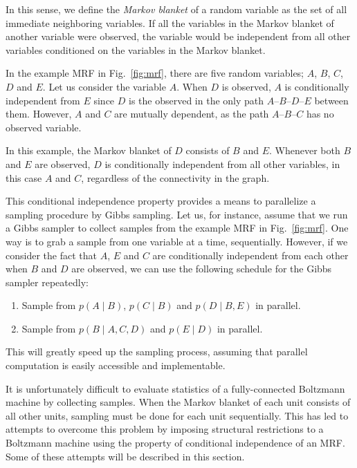 \documentclass[dissertation,nocontribution]{aaltoseries}
\begin{document}
In this sense, we define the \textit{Markov blanket} of a
random variable as the set of all immediate neighboring
variables. If all the variables in the Markov blanket of another
variable were observed, the variable would be independent from all
other variables conditioned on the variables in the Markov
blanket.

In the example MRF in Fig.~\ref{fig:mrf}, there are five
random variables; $A$, $B$, $C$, $D$ and $E$. Let us
consider the variable $A$. When $D$ is observed, $A$ is
conditionally independent from $E$ since $D$ is the observed
in the only path $A$--$B$--$D$--$E$ between them. However,
$A$ and $C$ are mutually dependent, as the path
$A$--$B$--$C$ has no observed variable.

In this example, the Markov blanket of $D$ consists of $B$ and
$E$. Whenever both $B$ and $E$ are observed, $D$ is
conditionally independent from all other variables, in this
case $A$ and $C$, regardless of the connectivity in the
graph.

This conditional independence property provides a means to
parallelize a sampling procedure by Gibbs sampling. Let
us, for instance, assume that we run a Gibbs sampler to
collect samples from the example MRF in Fig.~\ref{fig:mrf}. One way is to grab a
sample from one variable at a time, sequentially. However,
if we consider the fact that $A$, $E$ and $C$ are
conditionally independent from each other when $B$ and $D$
are observed, we can use the following schedule for the
Gibbs sampler repeatedly:
\begin{enumerate}
    \itemsep 0em
    \item Sample from $p(A\mid B)$, $p(C \mid B)$ and $p(D
        \mid B, E)$ in parallel.
    \item Sample from $p(B \mid A, C, D)$ and $p(E \mid D)$
        in parallel.
\end{enumerate}
This will greatly speed up the sampling process, assuming
that parallel computation is easily accessible and
implementable.

It is unfortunately difficult to evaluate
statistics of a fully-connected Boltzmann machine by
collecting samples. When the Markov blanket of each unit
consists of all other units, sampling must be done for each
unit sequentially. This has led to attempts to overcome this
problem by imposing structural restrictions to a Boltzmann
machine using the property of conditional independence of an
MRF. Some of these attempts will be described in this section.
\end{document}
